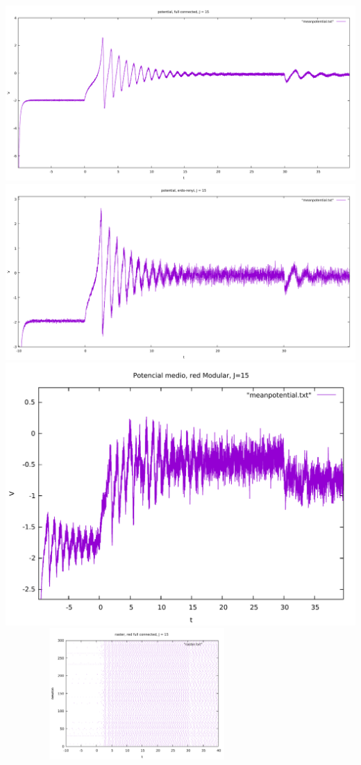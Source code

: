 \documentclass[a4paper]{article}
\begin{document}
\includegraphics[scale=0.2]{fullconnected_pot_J15.pdf}\\
\includegraphics[scale=0.2]{erdos_pot_J15.pdf}\\
\includegraphics[scale=0.4]{modular_pot_J15.pdf}\\
\includegraphics[width=10cm,height=5cm]{fullconnected_raster_J15.pdf}\\
\end{document}

